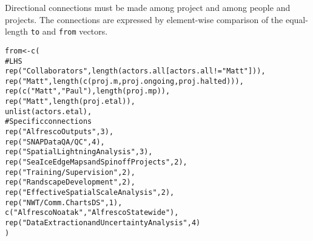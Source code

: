 \documentclass{article}\usepackage[]{graphicx}\usepackage[]{color}
\makeatletter
\newcommand{\hlnum}[1]{\textcolor[rgb]{0.863,0.196,0.184}{#1}}%
\newcommand{\hlstr}[1]{\textcolor[rgb]{0.863,0.196,0.184}{#1}}%
\newcommand{\hlcom}[1]{\textcolor[rgb]{0.345,0.431,0.459}{#1}}%
\newcommand{\hlopt}[1]{\textcolor[rgb]{0.576,0.631,0.631}{#1}}%
\newcommand{\hlstd}[1]{\textcolor[rgb]{0.514,0.58,0.588}{#1}}%
\newcommand{\hlkwb}[1]{\textcolor[rgb]{0.522,0.6,0}{#1}}%
\newcommand{\hlkwd}[1]{\textcolor[rgb]{0.576,0.631,0.631}{#1}}%
\newenvironment{kframe}{%
 \def\at@end@of@kframe{}%
 \ifinner\ifhmode%
  \def\at@end@of@kframe{\end{minipage}}%
  \begin{minipage}{\columnwidth}%
 \fi\fi%
 \def\FrameCommand##1{\hskip\@totalleftmargin \hskip-\fboxsep
 \colorbox{shadecolor}{##1}\hskip-\fboxsep
     \hskip-\linewidth \hskip-\@totalleftmargin \hskip\columnwidth}%
 \MakeFramed {\advance\hsize-\width
   \@totalleftmargin\z@ \linewidth\hsize
   \@setminipage}}%
 {\par\unskip\endMakeFramed%
 \at@end@of@kframe}
\newenvironment{knitrout}{}{} %
\makeatother
\begin{document}
Directional connections must be made among project and among people and projects.
The connections are expressed by element-wise comparison of the equal-length \texttt{to} and \texttt{from} vectors.

\begin{knitrout}
\color{fgcolor}\begin{kframe}
\begin{alltt}
\hlstd{from} \hlkwb{<-} \hlkwd{c}\hlstd{(}
        \hlcom{# LHS}
        \hlkwd{rep}\hlstd{(}\hlstr{"Collaborators"}\hlstd{,} \hlkwd{length}\hlstd{(actors.all[actors.all}\hlopt{!=}\hlstr{"Matt"}\hlstd{])),}
        \hlkwd{rep}\hlstd{(}\hlstr{"Matt"}\hlstd{,} \hlkwd{length}\hlstd{(}\hlkwd{c}\hlstd{(proj.m, proj.ongoing, proj.halted))),}
        \hlkwd{rep}\hlstd{(}\hlkwd{c}\hlstd{(}\hlstr{"Matt"}\hlstd{,} \hlstr{"Paul"}\hlstd{),} \hlkwd{length}\hlstd{(proj.mp)),}
        \hlkwd{rep}\hlstd{(}\hlstr{"Matt"}\hlstd{,} \hlkwd{length}\hlstd{(proj.etal)),}
        \hlkwd{unlist}\hlstd{(actors.etal),}
        \hlcom{# Specific connections}
        \hlkwd{rep}\hlstd{(}\hlstr{"Alfresco Outputs"}\hlstd{,} \hlnum{3}\hlstd{),}
        \hlkwd{rep}\hlstd{(}\hlstr{"SNAP Data QA/QC"}\hlstd{,} \hlnum{4}\hlstd{),}
        \hlkwd{rep}\hlstd{(}\hlstr{"Spatial Lightning Analysis"}\hlstd{,} \hlnum{3}\hlstd{),}
        \hlkwd{rep}\hlstd{(}\hlstr{"Sea Ice Edge Maps and Spinoff Projects"}\hlstd{,} \hlnum{2}\hlstd{),}
        \hlkwd{rep}\hlstd{(}\hlstr{"Training/Supervision"}\hlstd{,} \hlnum{2}\hlstd{),}
        \hlkwd{rep}\hlstd{(}\hlstr{"Randscape Development"}\hlstd{,} \hlnum{2}\hlstd{),}
        \hlkwd{rep}\hlstd{(}\hlstr{"Effective Spatial Scale Analysis"}\hlstd{,} \hlnum{2}\hlstd{),}
        \hlkwd{rep}\hlstd{(}\hlstr{"NWT/Comm. Charts DS"}\hlstd{,} \hlnum{1}\hlstd{),}
        \hlkwd{c}\hlstd{(}\hlstr{"Alfresco Noatak"}\hlstd{,} \hlstr{"Alfresco Statewide"}\hlstd{),}
        \hlkwd{rep}\hlstd{(}\hlstr{"Data Extraction and Uncertainty Analysis"}\hlstd{,} \hlnum{4}\hlstd{)}
\hlstd{)}


\end{alltt}
\end{kframe}
\end{knitrout}
\end{document}
